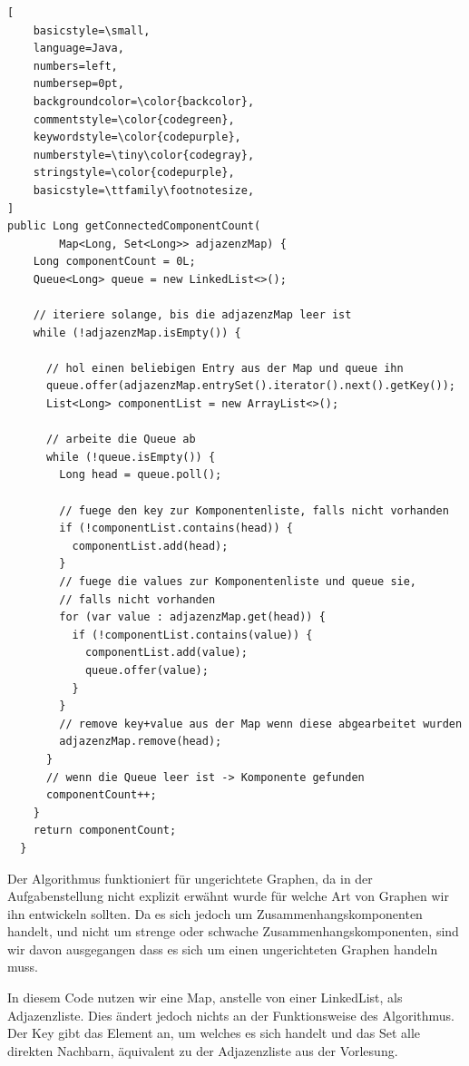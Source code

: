 \documentclass[ngerman,landscape,twocolumn]{adtexsheet}
\begin{document}

    \begin{lstlisting}[
    basicstyle=\small,
    language=Java,
    numbers=left,                    
    numbersep=0pt,
    backgroundcolor=\color{backcolor},
    commentstyle=\color{codegreen},
    keywordstyle=\color{codepurple},
    numberstyle=\tiny\color{codegray},
    stringstyle=\color{codepurple},
    basicstyle=\ttfamily\footnotesize,
]
public Long getConnectedComponentCount(
        Map<Long, Set<Long>> adjazenzMap) {
    Long componentCount = 0L;
    Queue<Long> queue = new LinkedList<>();
    
    // iteriere solange, bis die adjazenzMap leer ist
    while (!adjazenzMap.isEmpty()) {
      
      // hol einen beliebigen Entry aus der Map und queue ihn
      queue.offer(adjazenzMap.entrySet().iterator().next().getKey());
      List<Long> componentList = new ArrayList<>();
      
      // arbeite die Queue ab
      while (!queue.isEmpty()) {
        Long head = queue.poll();
        
        // fuege den key zur Komponentenliste, falls nicht vorhanden
        if (!componentList.contains(head)) {
          componentList.add(head);
        }
        // fuege die values zur Komponentenliste und queue sie, 
        // falls nicht vorhanden
        for (var value : adjazenzMap.get(head)) {
          if (!componentList.contains(value)) {
            componentList.add(value);
            queue.offer(value);
          }
        }
        // remove key+value aus der Map wenn diese abgearbeitet wurden
        adjazenzMap.remove(head);
      }
      // wenn die Queue leer ist -> Komponente gefunden
      componentCount++;
    }
    return componentCount;
  }
\end{lstlisting}
Der Algorithmus funktioniert für ungerichtete Graphen, da in der Aufgabenstellung nicht explizit erwähnt wurde für welche Art von Graphen wir ihn entwickeln sollten. Da es sich jedoch um Zusammenhangskomponenten handelt, und nicht um strenge oder schwache Zusammenhangskomponenten, sind wir davon ausgegangen dass es sich um einen ungerichteten Graphen handeln muss.

In diesem Code nutzen wir eine Map, anstelle von einer LinkedList, als Adjazenzliste. Dies ändert jedoch nichts an der Funktionsweise des Algorithmus. Der Key gibt das Element an, um welches es sich handelt und das Set alle direkten Nachbarn, äquivalent zu der Adjazenzliste aus der Vorlesung.
\end{document}
